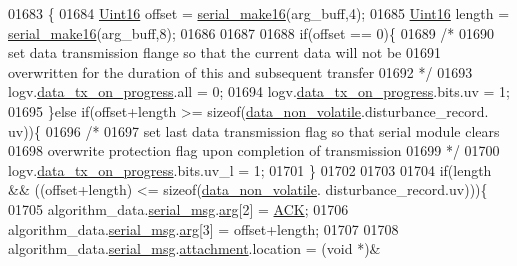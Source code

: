 \begin{DoxyCode}
{{{{{01683                 \{
01684                     \hyperlink{a00072_a59a9f6be4562c327cbfb4f7e8e18f08b}{Uint16} offset = \hyperlink{a00031_abc17de32f14103a5be219df0d4ad9176}{serial\_make16}(arg\_buff,4);
01685                     \hyperlink{a00072_a59a9f6be4562c327cbfb4f7e8e18f08b}{Uint16} length = \hyperlink{a00031_abc17de32f14103a5be219df0d4ad9176}{serial\_make16}(arg\_buff,8);
01686 
01687 
01688                    \textcolor{keywordflow}{if}(offset == 0)\{
01689                          \textcolor{comment}{/*}
01690 \textcolor{comment}{                         set data transmission flange so that the current data will not be}
01691 \textcolor{comment}{                         overwritten for the duration of this and subsequent transfer}
01692 \textcolor{comment}{                       */}
01693                         logv.\hyperlink{a00021_a6cdefde69642ef511e3252c38be68516}{data\_tx\_on\_progress}.all       = 0;
01694                         logv.\hyperlink{a00021_a6cdefde69642ef511e3252c38be68516}{data\_tx\_on\_progress}.bits.uv   = 1;
01695                     \}\textcolor{keywordflow}{else} \textcolor{keywordflow}{if}(offset+length >= \textcolor{keyword}{sizeof}(\hyperlink{a00060_a76ac5f917f5308dcd83de0d7c94559fb}{data\_non\_volatile}.disturbance\_record.
      uv))\{
01696                         \textcolor{comment}{/*}
01697 \textcolor{comment}{                         set last data transmission flag so that serial module clears}
01698 \textcolor{comment}{                         overwrite protection flag upon completion of transmission}
01699 \textcolor{comment}{                       */}
01700                         logv.\hyperlink{a00021_a6cdefde69642ef511e3252c38be68516}{data\_tx\_on\_progress}.bits.uv\_l = 1;
01701                     \}
01702 
01703 
01704                    \textcolor{keywordflow}{if}(length && ((offset+length) <= \textcolor{keyword}{sizeof}(\hyperlink{a00060_a76ac5f917f5308dcd83de0d7c94559fb}{data\_non\_volatile}.
      disturbance\_record.uv)))\{
01705                        algorithm\_data.\hyperlink{a00016_afcf5f557aea688aad985eec15269c1da}{serial\_msg}.\hyperlink{a00031_af7d6f762438c80072bd9dc0e4dd4ae1e}{arg}[2]                 = 
      \hyperlink{a00021_a6f6489887e08bff4887d0bc5dcf214d8}{ACK};
01706                        algorithm\_data.\hyperlink{a00016_afcf5f557aea688aad985eec15269c1da}{serial\_msg}.\hyperlink{a00031_af7d6f762438c80072bd9dc0e4dd4ae1e}{arg}[3]                 = offset+length;
01707 
01708                        algorithm\_data.\hyperlink{a00016_afcf5f557aea688aad985eec15269c1da}{serial\_msg}.\hyperlink{a00031_a040f6d5d58d18d8aeaf447eda7f50172}{attachment}.location    = (\textcolor{keywordtype}{void} *)&
}}}}}
\end{DoxyCode}
